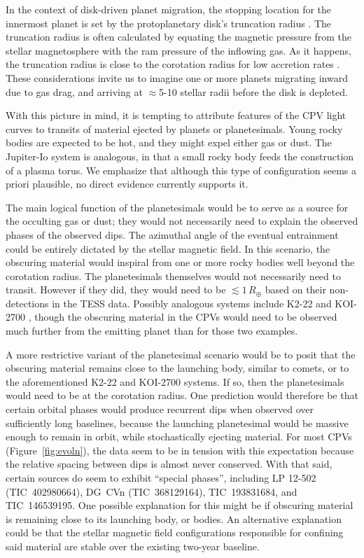 \documentclass[11pt,twocolumn,tighten]{aastex63}
\begin{document}
In the context of disk-driven planet migration, the stopping location
for the innermost planet is set by the protoplanetary disk's
truncation radius \citep[e.g.][and references
therein]{2018haex.bookE.142I}.  The truncation radius is often
calculated by equating the magnetic pressure from the stellar
magnetosphere with the ram pressure of the inflowing gas.  As it
happens, the truncation radius is close to the corotation radius for
low accretion rates
\citep[e.g.][]{2015SSRv..191..339R,2022MNRAS.510.5246L}.  These
considerations invite us to imagine one or more planets migrating
inward due to gas drag, and arriving at $\approx$5-10 stellar radii
before the disk is depleted.

With this picture in mind, it is tempting to attribute features of the
CPV light curves to transits of material ejected by planets or
planetesimals.  Young rocky bodies are expected to be hot, and they
might expel either gas or dust.  The Jupiter-Io system
\citep[e.g.][]{2004jpsm.book..537S} is analogous, in that a small
rocky body feeds the construction of a plasma torus.  We emphasize
that although this type of configuration seems a priori plausible, no
direct evidence currently supports it.

The main logical function of the planetesimals would be to serve as a
source for the occulting gas or dust; they would not necessarily need
to explain the observed phases of the observed dips.  The azimuthal
angle of the eventual entrainment could be entirely dictated by the
stellar magnetic field.  In this scenario, the obscuring material
would inspiral from one or more rocky bodies well beyond the
corotation radius.  The planetesimals themselves would not necessarily
need to transit.  However if they did, they would need to be $\lesssim
1$\,$R_\oplus$ based on their non-detections in the TESS data.
Possibly analogous systems include K2-22 \citep{2015ApJ...812..112S}
and KOI-2700 \citep{2014ApJ...784...40R}, though the obscuring
material in the CPVs would need to be observed much further from the
emitting planet than for those two examples.  

A more restrictive variant of the planetesimal scenario would be to
posit that the obscuring material remains close to the launching body,
similar to comets, or to the aforementioned K2-22 and KOI-2700
systems.  If so, then the planetesimals would need to be at the
corotation radius.  One prediction would therefore be that certain
orbital phases would produce recurrent dips when observed over
sufficiently long baselines, because the launching planetesimal would
be massive enough to remain in orbit, while stochastically ejecting
material.  For most CPVs (Figure~\ref{fig:evoln}), the data seem to be
in tension with this expectation because the relative spacing between
dips is almost never conserved.  With that said, certain sources do
seem to exhibit ``special phases'', including LP 12-502
(TIC~402980664), DG~CVn (TIC~368129164), TIC~193831684, and
TIC~146539195.  One possible explanation for this might be if
obscuring material is remaining close to its launching body, or
bodies.  An alternative explanation could be that the stellar magnetic
field configurations responsible for confining said material are
stable over the existing two-year baseline.
\end{document}
